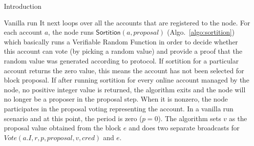 \documentclass[10pt,a4paper]{article}
\begin{document}
\begin{section}{Introduction}
\begin{subsection}{Vanilla run}
%
It next loops over all the accounts that are registered to the node. 
For each account $a$, the node runs $\mathsf{Sortition}(a, proposal)$ (Algo.~\ref{algo:sortition}) 
which basically runs a Verifiable Random Function in order to decide whether this account 
can vote (by picking a random value) and provide a proof that the random value was generated according
to protocol.
If sortition for a particular account returns the zero value, this means the account has
not been selected for block proposal. %
If after running sortition for every online account managed by the node, no positive integer value is returned,
the algorithm exits and the node will no longer be a proposer in the proposal step.
When it is nonzero, the node participates in the proposal voting representing the account.
In a vanilla run scenario and at this point, the period is zero ($p=0$). 
The algorithm sets $v$ as the proposal value obtained from the block $e$ and does two separate 
broadcasts for $Vote(a.I, r,p, proposal, v, cred)$ and $e$.


\end{subsection}
\end{section}
\end{document}
